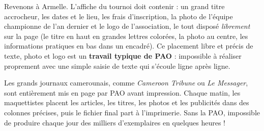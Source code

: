 \documentclass[11pt]{article}
\begin{document}
\begin{exemplebox}
Revenons à Armelle. L'affiche du tournoi doit contenir : un grand titre accrocheur, les dates et le lieu, les frais d'inscription, la photo de l'équipe championne de l'an dernier et le logo de l'association, le tout disposé \emph{librement} sur la page (le titre en haut en grandes lettres colorées, la photo au centre, les informations pratiques en bas dans un encadré). Ce placement libre et précis de texte, photo et logo est un \textbf{travail typique de PAO} : impossible à réaliser proprement avec une simple saisie de texte qui s'écoule ligne après ligne.
\end{exemplebox}

\begin{savaistu}
Les grands journaux camerounais, comme \emph{Cameroon Tribune} ou \emph{Le Messager}, sont entièrement mis en page par PAO avant impression. Chaque matin, les maquettistes placent les articles, les titres, les photos et les publicités dans des colonnes précises, puis le fichier final part à l'imprimerie. Sans la PAO, impossible de produire chaque jour des milliers d'exemplaires en quelques heures !
\end{savaistu}
\end{document}
